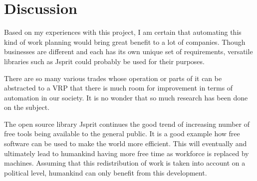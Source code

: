 \chapter{Discussion}
\label{chapter:discussion}

Based on my experiences with this project, I am certain that automating this kind of work planning would bring great benefit to a lot of companies. Though businesses are different and each has its own unique set of requirements, versatile libraries such as Jsprit could probably be used for their purposes.

There are so many various trades whose operation or parts of it can be abstracted to a VRP that there is much room for improvement in terms of automation in our society. It is no wonder that so much research has been done on the subject. 

The open source library Jsprit continues the good trend of increasing number of free tools being available to the general public. It is a good example how free software can be used to make the world more efficient. This will eventually and ultimately lead to humankind having more free time as workforce is replaced by machines. Assuming that this redistribution of work is taken into account on a political level, humankind can only benefit from this development.